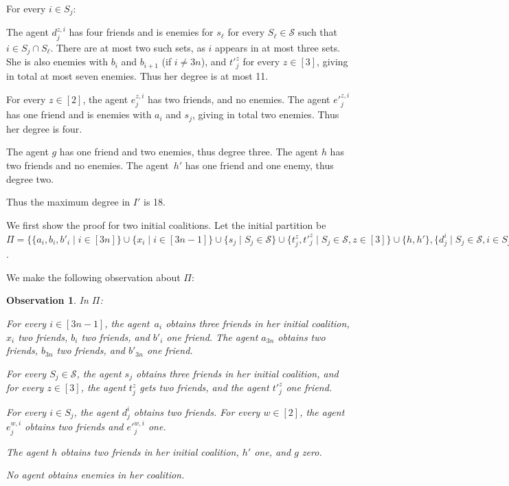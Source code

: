 \documentclass[a4paper,fleqn]{cas-sc}
\newcommand{\partition}{\ensuremath{\Pi}\xspace}
\newtheorem{obs}{Observation}
\newcommand{\sets}{\ensuremath{\mathcal{S}}}
\newcommand{\elements}{\ensuremath{[3n]}}
\newcommand{\sset}[1]{\ensuremath{S_{#1}}}
\begin{document}
{\begin{compactitem}
\begin{compactitem}
\item For every $i \in \sset j$:
\begin{compactitem}
\item The agent $d^{z,i}_j$ has four friends and is enemies for $s_\ell$ for every $\sset \ell \in \sets$ such that $i \in \sset j \cap \sset \ell$. There are at most two such sets, as $i$ appears in at most three sets. 
She is also enemies with $b_i$ and $b_{i + 1}$ (if $i \neq 3n$), and $t'^z_j$ for every $z \in [3]$, giving in total at most seven enemies.
Thus her degree is at most 11.
\item For every $z \in [2]$, the agent $e^{z,i}_j$ has two friends, and no enemies. The agent $e'^{z,i}_j$ has one friend and is enemies with $a_i$ and $s_j$, giving in total two enemies. 
Thus her degree is four.
\end{compactitem}
\end{compactitem}
\item The agent $g$ has one friend and two enemies, thus degree three. The agent $h$ has two friends and no enemies. The  agent~$h'$ has one friend and one enemy, thus degree two.
\end{compactitem}
Thus the maximum degree in $I'$ is 18.


We first show the proof for two initial coalitions.
Let the initial partition be $\partition = \{\{a_i, b_i, b'_i \mid i \in \elements\} \cup \{x_i \mid i \in [3n - 1]\}  \cup \{s_j \mid \sset j \in \sets\} \cup \{t^z_j, t'^z_j \mid \sset j \in \sets, z \in [3]\} \cup \{h,h'\},  \{d^i_j \mid \sset j \in \sets, i \in \sset j\} \cup \{e^{z,i}_j, e'^{z,i}_j \mid \sset j \in \sets, i \in \sset j, z \in [3]\}\} \cup \{g\} \}$.

We make the following observation about $\partition$:
\begin{obs}\label{obs:csvfriends}
In \partition:
\begin{compactenum}[(i)]
\item For every $i \in [3n - 1]$, the agent~$a_i$ obtains three friends in her initial coalition, $x_i$ two friends, $b_i$ two friends, and $b'_i$ one friend. The agent $a_{3n}$ obtains two friends, $b_{3n}$ two friends, and $b'_{3n}$ one friend.\label{obs:csvfriendsi}
\item For every $\sset j \in \sets$, the agent $s_j$ obtains three friends in her initial coalition, and for every $z \in [3]$, the agent $t^z_j$ gets two friends, and the agent $t'^z_j$ one friend. 

For every $i \in \sset j$, the agent $d^i_j$ obtains two friends. For every $w \in [2]$, the agent $e^{w, i}_j$ obtains two friends and $e'^{w, i}_j$ one.\label{obs:csvfriendss}
\item The agent $h$ obtains two friends in her initial coalition, $h'$ one, and $g$ zero.\label{obs:scvfriendsg}
\item No agent obtains enemies in her coalition.
\end{compactenum}
\end{obs}


}
\end{document}
